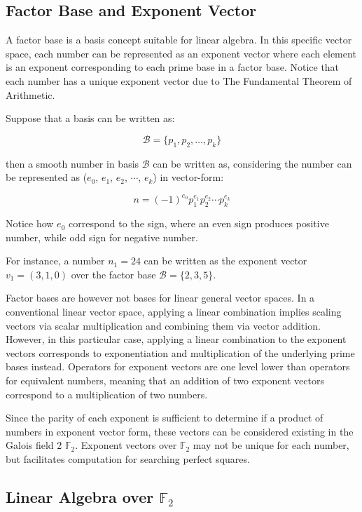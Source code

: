 \documentclass[11pt,a4paper]{article}
\begin{document}
\subsection*{Factor Base and Exponent Vector}

A factor base is a basis concept suitable for linear algebra. In this specific vector space, each number can be represented as an exponent vector where each element is an exponent corresponding to each prime base in a factor base. Notice that each number has a unique exponent vector due to The Fundamental Theorem of Arithmetic.

Suppose that a basis can be written as:

\[
\mathcal{B}=\{p_1,p_2,\ldots,p_k\}
\]

then a smooth number in basis $\mathcal{B}$ can be written as, considering the number can be represented as ($e_0$, $e_1$, $e_2$, $\cdots$, $e_k$) in vector-form:

$$
n = (-1)^{e_0}p_1^{e_1}p_2^{e_2}\cdots p_k^{e_k}
$$

Notice how $e_0$ correspond to the sign, where an even sign produces positive number, while odd sign for negative number.

For instance, a number $n_1 = 24$ can be written as the exponent vector $v_1 = (3, 1, 0)$ over the factor base $\mathcal{B}=\{2, 3, 5\}$.

Factor bases are however not bases for linear general vector spaces. In a conventional linear vector space, applying a linear combination implies scaling vectors via scalar multiplication and combining them via vector addition. However, in this particular case, applying a linear combination to the exponent vectors corresponds to exponentiation and multiplication of the underlying prime bases instead. Operators for exponent vectors are one level lower than operators for equivalent numbers, meaning that an addition of two exponent vectors correspond to a multiplication of two numbers.

Since the parity of each exponent is sufficient to determine if a product of numbers in exponent vector form, these vectors can be considered existing in the Galois field 2 $\mathbb{F}_2$. Exponent vectors over $\mathbb{F}_2$ may not be unique for each number, but facilitates computation for searching perfect squares.

\subsection*{Linear Algebra over $\mathbb{F}_2$}
\end{document}
